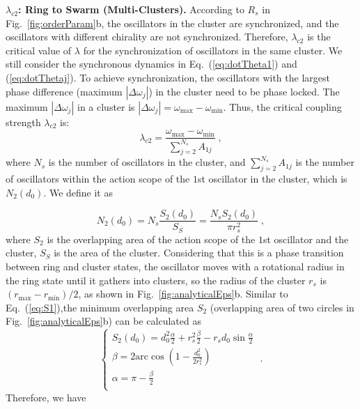 \documentclass[%
 aip,
 amsmath,amssymb,
 reprint,%
]{revtex4-1}
\begin{document}
\vspace{0.25cm}
\noindent\textbf{$\lambda_{c2}$: Ring to Swarm (Multi-Clusters).} According to $R_s$ in Fig.~\ref{fig:orderParam}b, the oscillators in the cluster are synchronized, and the oscillators with different chirality are not synchronized. Therefore, $\lambda_{c2}$ is the critical value of $\lambda$ for the synchronization of oscillators in the same cluster. We still consider the synchronous dynamics in Eq.~(\ref{eq:dotTheta1}) and (\ref{eq:dotThetaj}). To achieve synchronization, the oscillators with the largest phase difference (maximum $\left| \Delta \omega _j \right|$) in the cluster need to be phase locked. The maximum $\left| \Delta \omega _j \right|$ in a cluster is $\left| \Delta \omega _j \right|=\omega _{\max}-\omega _{\min}$. Thus, the critical coupling strength $\lambda_{c2}$ is:
\begin{equation}
    \lambda _{c2}=\frac{\omega _{\max}-\omega _{\min}}{\sum\nolimits_{j=2}^{N_s}{A_{1j}}}\;,
\end{equation}
where $N_s$ is the number of oscillators in the cluster, and $\sum\nolimits_{j=2}^{N_s}{A_{1j}}$ is the number of oscillators within the action scope of the $1$st oscillator in the cluster, which is $N_2\left( d_0 \right)$. We define it as

\begin{equation}
    N_2\left( d_0 \right) =N_s\frac{S_2\left( d_0 \right)}{S_S}=\frac{N_sS_2\left( d_0 \right)}{\pi r_{s}^{2}}\;,
\end{equation}
where $S_2$ is the overlapping area of the action scope of the $1$st oscillator and the cluster, $S_S$ is the area of the cluster. Considering that this is a phase transition between ring and cluster states, the oscillator moves with a rotational radius in the ring state until it gathers into clusters, so the radius of the cluster $r_s$ is $(r_{\max}-r_{\min})/2$, as shown in Fig.~\ref{fig:analyticalEps}b. Similar to Eq.~(\ref{eq:S1}),the minimum overlapping area $S_2$ (overlapping area of two circles in Fig.~\ref{fig:analyticalEps}b) can be calculated as
\begin{equation}
    \begin{cases}
        S_2\left( d_0 \right) =d_{0}^{2}\frac{\alpha}{2}+r_{s}^{2}\frac{\beta}{2}-r_sd_0\sin \frac{\alpha}{2}\\
        \beta =2\mathrm{arc}\cos \left( 1-\frac{d_{0}^{2}}{2r_{s}^{2}} \right)\\
        \alpha =\pi -\frac{\beta}{2}\\
    \end{cases}\;.
\end{equation}
Therefore, we have
\end{document}

